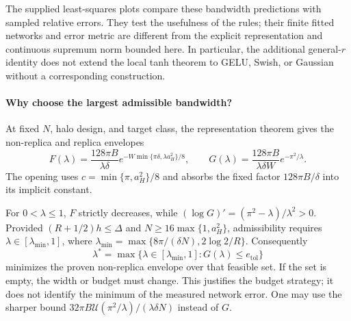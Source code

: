 The supplied least-squares plots compare these bandwidth predictions with
sampled relative errors. They test the usefulness of the rules; their
finite fitted networks and error metric are different from the explicit
representation and continuous supremum norm bounded here. In particular,
the additional general-$r$ identity does not extend the local tanh theorem
to GELU, Swish, or Gaussian without a corresponding construction.

\paragraph{Why choose the largest admissible bandwidth?}
At fixed $N$, halo design, and target class, the representation theorem gives
the non-replica and replica envelopes
\begin{equation}
 F(\lambda)=\frac{128\pi B}{\lambda\delta}
 e^{-W\min\{\pi\delta,\lambda a_H^2\}/8},\qquad
 G(\lambda)=\frac{128\pi B}{\lambda\delta W}e^{-\pi^2/\lambda}.
 \label{eq:lambda-budget-envelopes}
\end{equation}
The opening uses $c=\min\{\pi,a_H^2\}/8$ and absorbs the fixed factor $128\pi B/\delta$ into its implicit constant.

For $0<\lambda\le1$, $F$ strictly decreases, while
$(\log G)'=(\pi^2-\lambda)/\lambda^2>0$.
Provided $(R+1/2)h\le\Delta$ and $N\ge16\max\{1,a_H^2\}$, admissibility requires
$\lambda\in[\lambda_{\min},1]$, where
$\lambda_{\min}=\max\{8\pi/(\delta N),2\log2/R\}$.
Consequently
\[
 \lambda^*=\max\{\lambda\in[\lambda_{\min},1]:
                  G(\lambda)\le e_{\mathrm{tol}}\}
\]
minimizes the proven non-replica envelope over that feasible set. If the
set is empty, the width or budget must change. This justifies the budget
strategy; it does not identify the minimum of the measured network error.
One may use the sharper bound
$32\pi B\mathcal U(\pi^2/\lambda)/(\lambda\delta N)$ instead of $G$.

